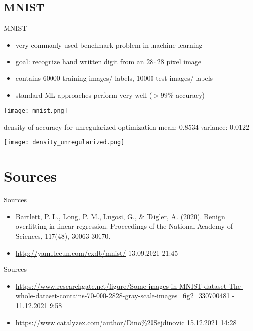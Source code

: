 \documentclass{beamer}
\begin{document}
\subsection{MNIST}

\begin{frame}{MNIST}
\begin{itemize}
	\item very commonly used benchmark problem in machine learning
	\item goal: recognize hand written digit from an \(28 \cdot 28\) pixel image
	\item contains 60000 training images/ labels, 10000 test images/ labels
	\item standard ML approaches perform very well (\(> 99 \%\) accuracy)
\end{itemize}
\begin{center}
	\texttt{[image: mnist.png]}
\end{center}
\end{frame}

\begin{frame}{density of accuracy for unregularized optimization}
mean: \(0.8534\) \hfill variance: \(0.0122\)
\begin{center}
	\texttt{[image: density\_unregularized.png]}
\end{center}
\end{frame}


\section{Sources}
\begin{frame}{Sources}
\tiny
\begin{itemize}
	\item Bartlett, P. L., Long, P. M., Lugosi, G., \& Tsigler, A. (2020). Benign overfitting in linear regression. Proceedings of the National Academy of Sciences, 117(48), 30063-30070.
	\item \url{http://yann.lecun.com/exdb/mnist/} 13.09.2021 21:45
\end{itemize}
\end{frame}

\begin{frame}{Sources}
\tiny
\begin{itemize}
	\item \url{https://www.researchgate.net/figure/Some-images-in-MNIST-dataset-The-whole-dataset-contains-70-000-2828-gray-scale-images_fig2_330700481} - 11.12.2021 9:58
	\item \url{https://www.catalyzex.com/author/Dino\%20Sejdinovic} 15.12.2021 14:28
\end{itemize}
\end{frame}
\end{document}
